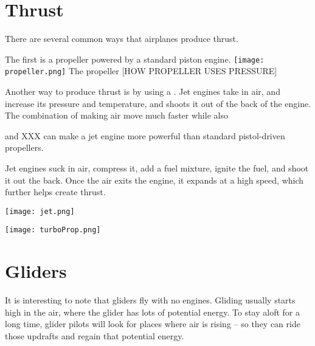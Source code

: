 \section{Thrust}

There are several common ways that airplanes produce thrust.

The first is a propeller powered by a standard piston engine.
\texttt{[image: propeller.png]}
The propeller [HOW PROPELLER USES PRESSURE]


Another way to produce thrust is by using a . Jet engines take in air, and increase its pressure and temperature, and shoots it out of the back of the engine. The combination of making air move much faster while also 

and XXX can make a jet engine more powerful than standard pistol-driven propellers. 


Jet engines suck in air, compress it, add a fuel mixture, ignite the fuel, and shoot it out the back. Once the air exits the engine, it expands at a high speed, which further helps create thrust. 




\texttt{[image: jet.png]}



\texttt{[image: turboProp.png]}


\section{Gliders}

It is interesting to note that gliders fly with no engines.   Gliding usually starts high in the air,  where the glider has lots of potential energy.   To stay aloft for a long
time,  glider pilots will look for places where air is rising -- so they can ride those updrafts and regain that potential energy.

